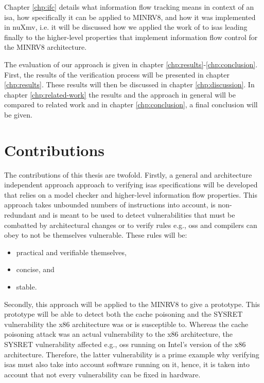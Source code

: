 Chapter \ref{chp:ifc} details what information flow tracking means in context of an \gls{isa}, how specifically it can be applied to MINRV8, and how it was implemented in nuXmv, i.e. it will be discussed how we applied the work of \citeauthor{Ferraiuolo17} \cite{Ferraiuolo17} to \glspl{isa} leading finally to the higher-level properties that implement information flow control for the MINRV8 architecture.

The evaluation of our approach is given in chapter \ref{chp:results}-\ref{chp:conclusion}.
First, the results of the verification process will be presented in chapter \ref{chp:results}.
These results will then be discussed in chapter \ref{chp:discussion}.
In chapter \ref{chp:related-work} the results and the approach in general will be compared to related work and in chapter \ref{chp:conclusion}, a final conclusion will be given.

\section{Contributions}

The contributions of this thesis are twofold.
Firstly, a general and architecture independent approach approach to verifying \glspl{isa} specifications will be developed that relies on a model checker and higher-level information flow properties.
This approach takes unbounded numbers of instructions into account, is non-redundant and is meant to be used to detect vulnerabilities that must be combatted by architectural changes or to verify rules e.g., \glspl{os} and compilers can obey to not be themselves vulnerable.
These rules will be:
\begin{itemize}
    \item practical and verifiable themselves,
    \item concise, and
    \item stable.
\end{itemize}

Secondly, this approach will be applied to the MINRV8 to give a prototype.
This prototype will be able to detect both the cache poisoning and the SYSRET vulnerability the x86 architecture was or is susceptible to.
Whereas the cache poisoning attack was an actual vulnerability to the x86 architecture, the SYSRET vulnerability affected e.g., \glspl{os} running on Intel's version of the x86 architecture.
Therefore, the latter vulnerability is a prime example why verifying \glspl{isa} must also take into account software running on it, hence, it is taken into account that not every vulnerability can be fixed in hardware.
